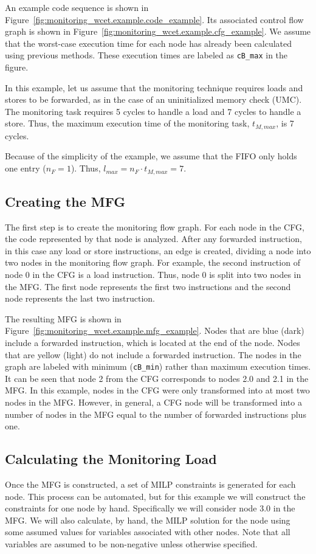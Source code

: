 An example code sequence is shown in
Figure~\ref{fig:monitoring_wcet.example.code_example}. Its associated control
flow graph is shown in
Figure~\ref{fig:monitoring_wcet.example.cfg_example}. We assume that the worst-case
execution time for each node has already been calculated using previous
methods. These execution times are labeled as {\tt cB\_max} in the figure.

In this example, let us assume that the monitoring technique requires loads and
stores to be forwarded, as in the case of an uninitialized memory check (UMC).
The monitoring task requires 5 cycles to handle a load and 7 cycles to handle a
store. Thus, the maximum execution time of the monitoring task, $t_{M, max}$,
is 7 cycles.

Because of the simplicity of the example, we assume that the FIFO only holds
one entry ($n_F = 1$). Thus, $l_{max} = n_F \cdot t_{M, max} = 7$.

\subsection{Creating the MFG}

The first step is to create the monitoring flow graph. For each node in the
CFG, the code represented by that node is analyzed. After any forwarded
instruction, in this case any load or store instructions, an edge is created,
dividing a node into two nodes in the monitoring flow graph. 
For example, the second instruction of node 0 in the CFG is a load instruction.
Thus, node 0 is split into two nodes in the MFG. The first node represents the
first two instructions and the second node represents the last two instruction. 

The resulting MFG is shown in Figure~\ref{fig:monitoring_wcet.example.mfg_example}.
Nodes that are blue (dark) include a forwarded instruction, which is located at
the end of the node. Nodes that are yellow (light) do not include a forwarded
instruction. The nodes in the graph are labeled with minimum ({\tt cB\_min})
rather than maximum execution times. It can be seen that node 2 from the CFG
corresponds to nodes 2.0 and 2.1 in the MFG. In this example, nodes in the CFG
were only transformed into at most two nodes in the MFG.  However, in general,
a CFG node will be transformed into a number of nodes in the MFG equal to the
number of forwarded instructions plus one.

\subsection{Calculating the Monitoring Load}
Once the MFG is constructed, a set of MILP constraints is generated for each
node. This process can be automated, but for this example we will construct the
constraints for one node by hand. Specifically we will consider node 3.0 in the
MFG. We will also calculate, by hand, the MILP solution for the node using some
assumed values for variables associated with other nodes. Note that all
variables are assumed to be non-negative unless otherwise specified.

